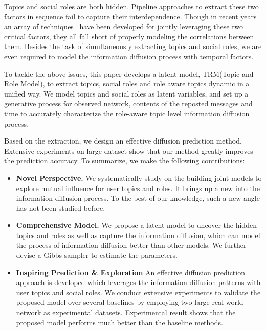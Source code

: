 \documentclass[runningheads,a4paper]{llncs}
\begin{document}
Topics and social roles are both hidden. Pipeline approaches to extract these two factors in sequence fail to capture their interdependence. Though in recent years an array of techniques~\cite{yang2015rain,burt2009structural,Pinto2014Modeling,Zhang2014Role} have been developed for jointly leveraging these two critical factors, they all fall short of properly modeling the correlations between them. Besides the task of simultaneously extracting topics and social roles, we are even required to model the information diffusion process with temporal factors.

To tackle the above issues, this paper develops a latent model, TRM(Topic and Role Model), to extract topics, social roles and role aware topics dynamic in a unified way. We model topics and social roles as latent variables, and set up a generative process for observed network, contents of the reposted messages and time to accurately characterize the role-aware topic level information diffusion process.

Based on the extraction, we design an effective diffusion prediction method. Extensive experiments on large dataset show that our method greatly improves the prediction accuracy. To summarize, we make the following contributions:


\begin{itemize}
\item \textbf{Novel Perspective.} We systematically study on the building joint models to explore mutual influence for user topics and roles. It brings up a new into the information diffusion process. To the best of our knowledge, such a new angle has not been studied before.

  \item\textbf{Comprehensive Model.} We propose a latent model to uncover the hidden topics and roles as well as capture the information diffusion, which can model the process of information diffusion better than other models. We further devise a Gibbs sampler to estimate the parameters.

  \item \textbf{Inspiring Prediction \& Exploration} An effective diffusion prediction approach is developed which leverages the information diffusion patterns with user topics and social roles. We conduct extensive experiments to validate the proposed model over several baselines by employing two large real-world network as experimental datasets. Experimental result shows that the proposed model performs much better than the baseline methods.
\end{itemize}
\end{document}
